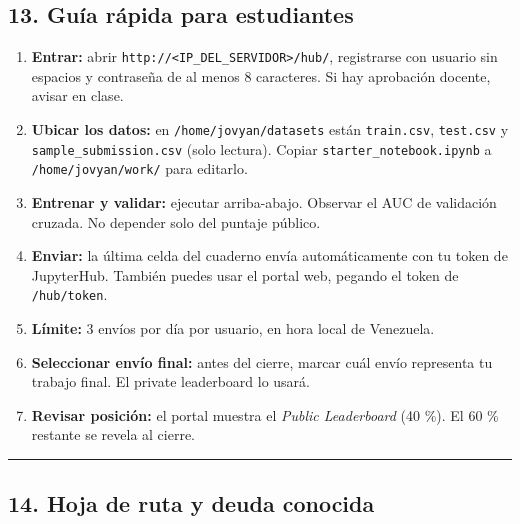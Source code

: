 \documentclass[11pt,a4paper]{article}
\providecommand{\tightlist}{%
  \setlength{\itemsep}{0pt}\setlength{\parskip}{0pt}}
\begin{document}
\hypertarget{13-guuxeda-ruxe1pida-para-estudiantes}{%
\subsection{13. Guía rápida para estudiantes}\label{13-guuxeda-ruxe1pida-para-estudiantes}}

\begin{enumerate}
\def\labelenumi{\arabic{enumi}.}
\tightlist
\item
  \textbf{Entrar:} abrir \texttt{http://\textless{}IP\_DEL\_SERVIDOR\textgreater{}/hub/}, registrarse con usuario sin espacios y contraseña de al menos 8 caracteres. Si hay aprobación docente, avisar en clase.
\item
  \textbf{Ubicar los datos:} en \texttt{/\allowbreak{}home/\allowbreak{}jovyan/\allowbreak{}datasets} están \texttt{train.\allowbreak{}csv}, \texttt{test.\allowbreak{}csv} y \texttt{sample\_\allowbreak{}submission.\allowbreak{}csv} (solo lectura). Copiar \texttt{starter\_\allowbreak{}notebook.\allowbreak{}ipynb} a \texttt{/\allowbreak{}home/\allowbreak{}jovyan/\allowbreak{}work/\allowbreak{}} para editarlo.
\item
  \textbf{Entrenar y validar:} ejecutar arriba-abajo. Observar el AUC de validación cruzada. No depender solo del puntaje público.
\item
  \textbf{Enviar:} la última celda del cuaderno envía automáticamente con tu token de JupyterHub. También puedes usar el portal web, pegando el token de \texttt{/\allowbreak{}hub/\allowbreak{}token}.
\item
  \textbf{Límite:} 3 envíos por día por usuario, en hora local de Venezuela.
\item
  \textbf{Seleccionar envío final:} antes del cierre, marcar cuál envío representa tu trabajo final. El private leaderboard lo usará.
\item
  \textbf{Revisar posición:} el portal muestra el \emph{Public Leaderboard} (40 \%). El 60 \% restante se revela al cierre.
\end{enumerate}

\begin{center}\rule{0.5\linewidth}{0.5pt}\end{center}

\hypertarget{14-hoja-de-ruta-y-deuda-conocida}{%
\subsection{14. Hoja de ruta y deuda conocida}\label{14-hoja-de-ruta-y-deuda-conocida}}
\end{document}
